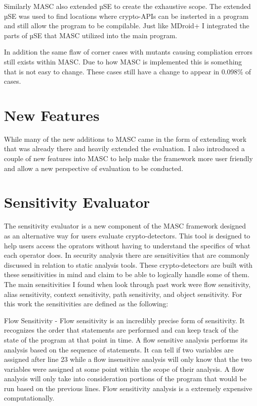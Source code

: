 Similarly MASC also extended µSE to create the exhaustive scope. The extended µSE was used to find locations where crypto-APIs can be insterted in a program and still allow the program to be compilable. Just like MDroid+ I integrated the parts of µSE that MASC utilized into the main program. 

In addition the same flaw of corner cases with mutants causing compliation errors still exists within MASC. Due to how MASC is implemented this is something that is not easy to change. These cases still have a change to appear in 0.098\% of cases.


\section{New Features}
\label{ch3:sec:new-features}

While many of the new additions to MASC came in the form of extending work that was already there and heavily extended the evaluation. I also introduced a couple of new features into MASC to help make the framework more user friendly and allow a new perspective of evaluation to be conducted.

\section{Sensitivity Evaluator}
\label{ch3:subsec:sensitities}

The sensitivity evaluator is a new component of the MASC framework designed as an alternative way for users evaluate crypto-detectors. This tool is designed to help users access the oprators without having to understand the specifics of what each operator does. In security analysis there are sensitivities that are commonly discussed in relation to static analysis tools. These crypto-detectors are built with these sensitivities in mind and claim to be able to logically handle some of them. The main sensitivities I found when look through past work were flow sensitivity, alias sensitivity, context sensitivity, path sensitivity, and object sensitivity. For this work the sensitivities are defined as the following:

Flow Sensitivity - Flow sensitivity is an incredibly precise form of sensitivity. It recognizes the order that statements are performed and can keep track of the state of the program at that point in time. A flow sensitive analysis performs its analysis based on the sequence of statements. It can tell if two variables are assigned after line 23 while a flow insensitive analysis will only know that the two variables were assigned at some point within the scope of their analysis. A flow analysis will only take into consideration portions of the program that would be run based on the previous lines. Flow sensitivity analysis is a extremely expensive computationally.

